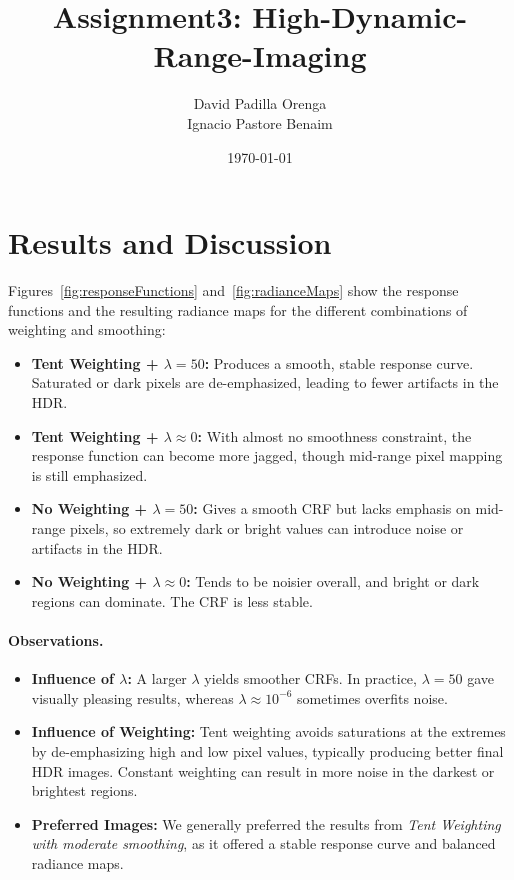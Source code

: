 \documentclass[a4paper,10pt]{article}
\title{Assignment3: High-Dynamic-Range-Imaging}
\author{David Padilla Orenga \\ Ignacio Pastore Benaim}
\date{\today}
\begin{document}
\maketitle
\thispagestyle{empty}

\section{Results and Discussion}
Figures~\ref{fig:responseFunctions} and~\ref{fig:radianceMaps} show the response functions and the resulting radiance maps for the different combinations of weighting and smoothing:
\begin{itemize}
    \item \textbf{Tent Weighting + \(\lambda=50\):} Produces a smooth, stable response curve.  Saturated or dark pixels are de-emphasized, leading to fewer artifacts in the HDR.
    \item \textbf{Tent Weighting + \(\lambda\approx0\):} With almost no smoothness constraint, the response function can become more jagged, though mid-range pixel mapping is still emphasized.
    \item \textbf{No Weighting + \(\lambda=50\):} Gives a smooth CRF but lacks emphasis on mid-range pixels, so extremely dark or bright values can introduce noise or artifacts in the HDR.
    \item \textbf{No Weighting + \(\lambda\approx0\):} Tends to be noisier overall, and bright or dark regions can dominate.  The CRF is less stable.
\end{itemize}

\paragraph{Observations.}
\begin{itemize}
    \item \textbf{Influence of \(\lambda\):} A larger \(\lambda\) yields smoother CRFs.  In practice, \(\lambda=50\) gave visually pleasing results, whereas \(\lambda \approx 10^{-6}\) sometimes overfits noise.
    \item \textbf{Influence of Weighting:} Tent weighting avoids saturations at the extremes by de-emphasizing high and low pixel values, typically producing better final HDR images.  Constant weighting can result in more noise in the darkest or brightest regions.
    \item \textbf{Preferred Images:} We generally preferred the results from \textit{Tent Weighting with moderate smoothing}, as it offered a stable response curve and balanced radiance maps.
\end{itemize}
\end{document}
